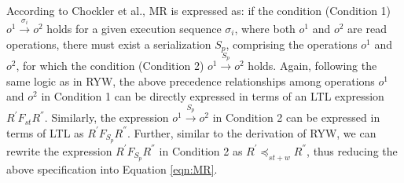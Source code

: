 \documentclass[acmlarge, ,11pt]{acmart}
\begin{document}
  According to Chockler et al.,
 MR is expressed as: if the condition  (Condition 1) $\mathit{o}^1 \xrightarrow{\sigma_i} \mathit{o}^2$ holds for a given execution sequence $\sigma_i$, where both $\mathit{o}^1$ and $\mathit{o}^2$ are read operations,
  there must exist a serialization ${S_p}$, comprising the
   operations $\mathit{o}^1$ and $\mathit{o}^2$, for which the condition (Condition 2)
  $\mathit{o}^1 \xrightarrow{S_p} \mathit{o}^2$ holds.
   Again, following the same logic as in RYW, the above precedence relationships among operations $\mathit{o}^1$ and $\mathit{o}^2$ in Condition 1 can be directly
  expressed in terms of an LTL expression
    $R^{'} F_\mathit{st} R^{''} $.   Similarly, the expression $\mathit{o}^1 \xrightarrow{S_p} \mathit{o}^2$ in Condition 2
  can be expressed in terms of LTL as $R^{'} F_{S_p} R^{''}$.
    Further, similar to the derivation of RYW,  we can rewrite the expression $R^{'} F_{S_p} R^{''} $ in Condition 2 as  $R^{'} \preccurlyeq_{\mathit{st}+w} R^{''}$, thus reducing the above specification  into Equation \ref{eqn:MR}.
\end{document}
